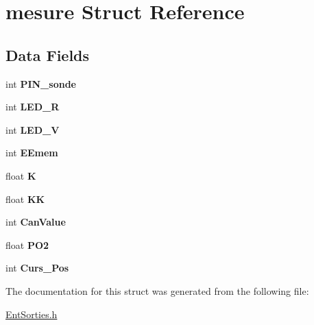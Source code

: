 \hypertarget{structmesure}{
\section{mesure Struct Reference}
\label{structmesure}
}
\subsection*{Data Fields}
\begin{DoxyCompactItemize}
\item 
\hypertarget{structmesure_a485eb5c9677821299f710f191b5d321a}{
int {\bfseries PIN\_\-sonde}}
\label{structmesure_a485eb5c9677821299f710f191b5d321a}

\item 
\hypertarget{structmesure_a1d97bae777b0287c7748a49d8410dd00}{
int {\bfseries LED\_\-R}}
\label{structmesure_a1d97bae777b0287c7748a49d8410dd00}

\item 
\hypertarget{structmesure_afeb95e0e103773894f6b0f6237ba2a48}{
int {\bfseries LED\_\-V}}
\label{structmesure_afeb95e0e103773894f6b0f6237ba2a48}

\item 
\hypertarget{structmesure_afea5368ec979042c523c7a87c940076a}{
int {\bfseries EEmem}}
\label{structmesure_afea5368ec979042c523c7a87c940076a}

\item 
\hypertarget{structmesure_a45107e42fd439c0fbdef3d1d805687c3}{
float {\bfseries K}}
\label{structmesure_a45107e42fd439c0fbdef3d1d805687c3}

\item 
\hypertarget{structmesure_a7ba87074aafaa176fc5b1cff4b25beae}{
float {\bfseries KK}}
\label{structmesure_a7ba87074aafaa176fc5b1cff4b25beae}

\item 
\hypertarget{structmesure_a9b8d2f5da174f58af2e72be211d1758c}{
int {\bfseries CanValue}}
\label{structmesure_a9b8d2f5da174f58af2e72be211d1758c}

\item 
\hypertarget{structmesure_a62a431fd948053ce453aed9b5c95a825}{
float {\bfseries PO2}}
\label{structmesure_a62a431fd948053ce453aed9b5c95a825}

\item 
\hypertarget{structmesure_a9d8a38f553cc1aa971063ec9c984f0c0}{
int {\bfseries Curs\_\-Pos}}
\label{structmesure_a9d8a38f553cc1aa971063ec9c984f0c0}

\end{DoxyCompactItemize}


The documentation for this struct was generated from the following file:\begin{DoxyCompactItemize}
\item 
\hyperlink{EntSorties_8h}{EntSorties.h}\end{DoxyCompactItemize}

